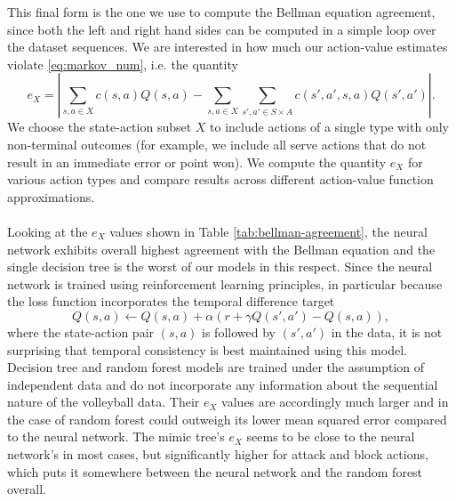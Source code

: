 \documentclass{sfuthesis}
\begin{document}
This final form is the one we use to compute the Bellman equation agreement, since both the left and right hand sides can be computed in a simple loop over the dataset sequences. We are interested in how much our action-value estimates violate \eqref{eq:markov_num}, i.e. the quantity
\begin{equation}
e_X = |\sum_{s,a\in X} c(s,a)Q(s,a) - \sum_{s,a\in X} \sum_{s',a'\in S\times A} c(s',a',s,a) Q(s',a') |.
\label{eq:markov_num2}
\end{equation}
We choose the state-action subset $X$ to include actions of a single type with only non-terminal outcomes (for example, we include all serve actions that do not result in an immediate error or point won). We compute the quantity $e_X$ for various action types and compare results across different action-value function approximations.\\\\
Looking at the $e_X$ values shown in Table \ref{tab:bellman-agreement}, the neural network exhibits overall highest agreement with the Bellman equation and the single decision tree is the worst of our models in this respect. Since the neural network is trained using reinforcement learning principles, in particular because the loss function incorporates the temporal difference target 
$$Q(s,a) \leftarrow Q(s,a) + \alpha (r + \gamma Q(s', a') - Q(s,a)),$$
where the state-action pair $(s,a)$ is followed by $(s',a')$ in the data, it is not surprising that temporal consistency is best maintained using this model. Decision tree and random forest models are trained under the assumption of independent data and do not incorporate any information about the sequential nature of the volleyball data. Their $e_X$ values are accordingly much larger and in the case of random forest could outweigh its lower mean squared error compared to the neural network. The mimic tree's $e_X$ seems to be close to the neural network's in most cases, but significantly higher for attack and block actions, which puts it somewhere between the neural network and the random forest overall.
\end{document}
